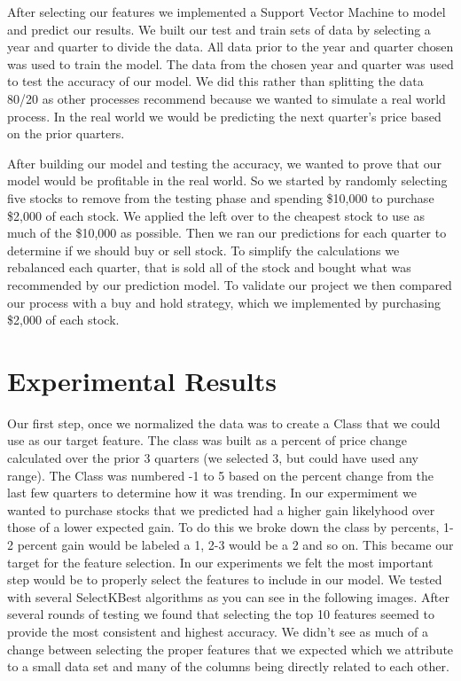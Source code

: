 \documentclass[conference]{IEEEtran}
\begin{document}
After selecting our features we implemented a Support Vector Machine to model and predict our results.  We built our test and train sets of data by selecting a year and quarter to divide the data.  All data prior to the year and quarter chosen was used to train the model. The data from the chosen year and quarter was used to test the accuracy of our model.  We did this rather than splitting the data 80/20 as other processes recommend because we wanted to simulate a real world process.  In the real world we would be predicting the next quarter's price based on the prior quarters.  

After building our model and testing the accuracy, we wanted to prove that our model would be profitable in the real world.  So we started by randomly selecting five stocks to remove from the testing phase and spending \$10,000 to purchase \$2,000 of each stock.  We applied the left over to the cheapest stock to use as much of the \$10,000 as possible. Then we ran our predictions for each quarter to determine if we should buy or sell stock.  To simplify the calculations we rebalanced each quarter, that is sold all of the stock and bought what was recommended by our prediction model.  To validate our project we then compared our process with a buy and hold strategy, which we implemented by purchasing \$2,000 of each stock.


\section{Experimental Results}
Our first step, once we normalized the data was to create a Class that we could use as our target feature.  The class was built as a percent of price change calculated over the prior 3 quarters (we selected 3, but could have used any range). The Class was numbered -1 to 5 based on the percent change from the last few quarters to determine how it was trending.  In our expermiment we wanted to purchase stocks that we predicted had a higher gain likelyhood over those of a lower expected gain.  To do this we broke down the class by percents, 1-2 percent gain would be labeled a 1, 2-3 would be a 2 and so on. This became our target for the feature selection.
In our experiments we felt the most important step would be to properly select the features to include in our model. We tested with several SelectKBest algorithms as you can see in the following images. After several rounds of testing we found that selecting the top 10 features seemed to provide the most consistent and highest accuracy.  We didn't see as much of a change between selecting the proper features that we expected which we attribute to a small data set and many of the columns being directly related to each other.  
\end{document}
